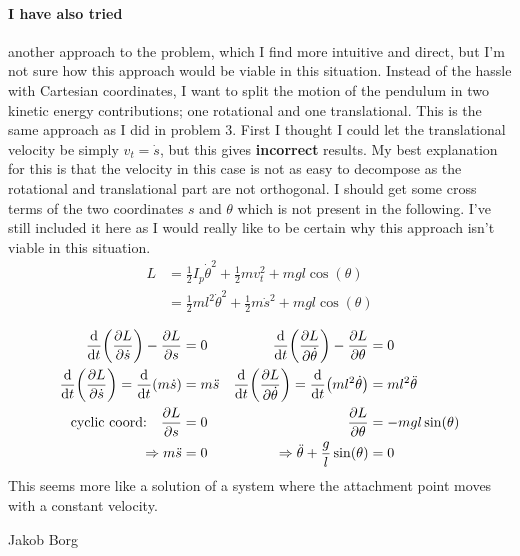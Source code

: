 \documentclass[11pt,a4paper]{report}
\newcounter{excount}[chapter]
\newenvironment{exercise}[1][]{\addtocounter{excount}{1} \noindent {\bf Problem
    \arabic{excount} \ \ #1}\hspace{2mm}}{\vspace{4mm}}
\newenvironment{solution}
    {\begin{tcolorbox}[title=Solution,halign lower=right,breakable]
    }
    {
    \tcblower Jakob Borg
    \end{tcolorbox}
	\vspace{5mm}
    }
\newcommand{\half}
{
\frac{1}{2}
}
\newcommand{\Leq}[1]
{
\dv{t}\qty(\pdv{L}{\dot{#1}}) - \pdv{L}{#1}
}
\newcommand{\Lpdv}[1]
{
\pdv{L}{#1}
}
\newcommand{\dtheta}
{
\dot{\theta}
}
\begin{document}
\begin{exercise}
\begin{solution}
\paragraph*{I have also tried} another approach to the problem, which I find more intuitive and direct, but I'm not sure how this approach would be viable in this situation. Instead of the hassle with Cartesian coordinates, I want to split the motion of the pendulum in two kinetic energy contributions; one rotational and one translational. This is the same approach as I did in problem 3. First I thought I could let the translational velocity be simply $v_t = \dot{s}$, but this gives \textbf{incorrect} results. My best explanation for this is that the velocity in this case is not as easy to decompose as the rotational and translational part are not orthogonal. I should get some cross terms of the two coordinates $s$ and $\theta$ which is not present in the following. I've still included it here as I would really like to be certain why this approach isn't viable in this situation.
\begin{align*}
	L &= \half I_p \dtheta^2 + \half m v_t^2 + mgl\cos(\theta)
	\\
	&= \half ml^2 \dtheta^2 + \half m \dot{s}^2 + mgl \cos(\theta)
\end{align*}

\begin{align*}
	\Leq{s} &= 0 
	& \Leq{\theta} &=0
	\\
	\dv{t}\qty( \Lpdv{\dot{s}} ) = \dv{t} \qty(m\dot{s} ) &= m\ddot{s}	
	 &
	 \dv{t} \qty( \Lpdv{\dot{\theta}} ) = \dv{t} \qty( ml^2 \dot{\theta} ) &= ml^2 \ddot{\theta}
	\\	 
	\qq*{cyclic coord:} \Lpdv{s} &= 0 
	& \Lpdv{\theta} &= -mgl \sin(\theta)
	\\
	\Rightarrow m\ddot{s} &= 0 
	& \Rightarrow \ddot{\theta} + \frac{g}{l} \sin(\theta) &=0
\end{align*}
This seems more like a solution of a system where the attachment point moves with a constant velocity.
\end{solution}
\end{exercise}
\end{document}
